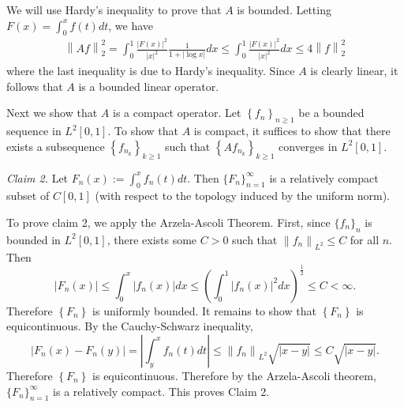 \documentclass[answers]{exam}
\theoremstyle{problemstyle}
\newcommand{\vt}{\vskip 5mm} %
\newcommand{\norm}[1]{\left\lVert#1\right\rVert} %
\newcommand{\1}[1]{\textbf{1}_{\left[#1\right]}} %
\def\({\left (}
\def\){\right )}
\begin{document}
\begin{questions}
\begin{solution}
  We will use Hardy's inequality to prove that $A$ is bounded. Letting $F(x) = \int_{0}^{x}f(t)dt$, we have
  \begin{align*}
    \norm{Af}_{2}^{2} = \int_{0}^{1}\frac{|F(x)|^{2}}{|x|^{2}} \frac{1}{1+|\log x|}dx \leq \int_{0}^{1}\frac{|F(x)|^{2}}{|x|^{2}}dx \leq 4 \norm{f}^{2}_{2}
  \end{align*}
  where the last inequality is due to Hardy's inequality. Since $A$ is clearly linear, it follows that $A$ is a bounded linear operator.
  
  Next we show that $A$ is a compact operator. Let $\left\{ f_{n} \right\}_{n\geq 1}$ be a bounded sequence in $L^{2}[0,1]$. To show that $A$ is compact, it suffices to show that there exists a subsequence $\left\{ f_{n_{k}} \right\}_{k\geq 1}$ such that $\left\{ Af_{n_{k}} \right\}_{k\geq 1}$ converges in $L^{2}[0,1]$.

  
  \vt
  \textit{Claim 2.} Let $F_{n}(x):=\int_{0}^{x}f_{n}(t)dt$. Then $\{F_{n}\}_{n=1}^{\infty}$ is a relatively compact subset of $C[0,1]$ (with respect to the topology induced by the uniform norm).

  To prove claim 2, we apply the Arzela-Ascoli Theorem. First, since $\{f_{n}\}_{n}$ is bounded in $L^{2}[0,1]$, there exists some $C>0$ such that $\norm{f_{n}}_{L^{2}}\leq C$ for all $n$. Then
  \begin{equation*}
    |F_{n}(x)| \leq \int_{0}^{x}|f_{n}(x)|dx \leq \(\int_{0}^{1}|f_{n}(x)|^{2}dx \)^{\frac{1}{2}} \leq C <\infty.
  \end{equation*}
  Therefore $\left\{ F_{n} \right\}$ is uniformly bounded. It remains to show that $\left\{ F_{n} \right\}$ is equicontinuous. By the Cauchy-Schwarz inequality,
  \begin{equation*}
    \left| F_{n}(x)-F_{n}(y) \right| = \left| \int_{y}^{x}f_{n}(t)dt \right| \leq \norm{f_{n}}_{L^{2}} \sqrt{|x-y|} \leq C \sqrt{|x-y|}.
  \end{equation*}
  Therefore  $\left\{ F_{n} \right\}$ is equicontinuous. Therefore by the Arzela-Ascoli theorem, $\{F_{n}\}_{n=1}^{\infty}$ is a relatively compact. This proves Claim 2.


\end{solution}
\end{questions}
\end{document}
